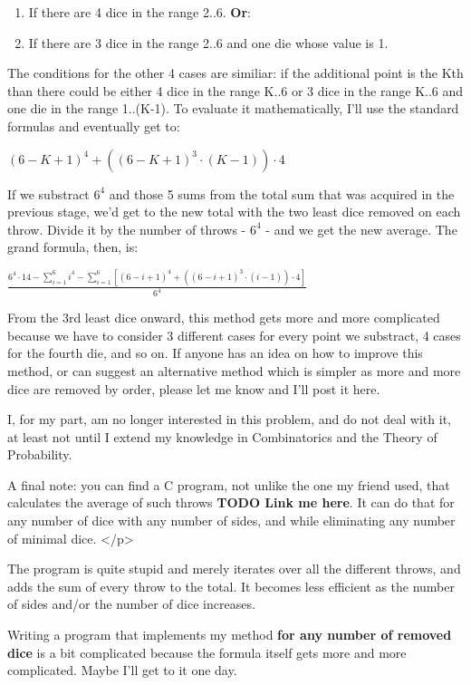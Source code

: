 \documentclass[a4paper]{article}
\begin{document}
\begin{enumerate}
\item If there are 4 dice in the range 2..6. {\bf Or}:
\item If there are 3 dice in the range 2..6 and one die whose value is 1.
\end{enumerate}

The conditions for the other 4 cases are similiar: if the additional point
is the Kth than there could be either 4 dice in the range K..6 or 3 dice in
the range K..6 and one die in the range 1..(K-1). To evaluate it
mathematically, I'll use the standard formulas and eventually get to:

$\left(6-K+1\right)^4  +  \left( \left(6-K+1\right)^3 \cdot \left(K-1\right) \right) \cdot 4$


If we substract $6^4$ and those 5 sums from the total sum that was acquired in
the previous stage, we'd get to the new total with the two least dice
removed on each throw. Divide it by the number of throws - $6^4$ - and we get
the new average. The grand formula, then, is:

$ \frac{
    6^4\cdot14-\sum\limits_{i=1}^{6}\left.i^4\right. -
    \sum\limits_{i=1}^{6}\left[\left(6-i+1\right)^4+\left(\left(6-i+1\right)^3
    \cdot \left(i-1\right)\right) \cdot 4 \right]
}{6^4}$

From the 3rd least dice onward, this method gets more and more complicated
because we have to consider 3 different cases for every point we
substract, 4 cases for the fourth die, and so on. If anyone has an idea
on how to improve this method, or can suggest an alternative method
which is simpler as more and more dice are removed by order, please let
me know and I'll post it here.

I, for my part, am no longer interested in this problem, and do not deal
with it, at least not until I extend my knowledge in Combinatorics and the
Theory of Probability.

A final note: you can find a C program, not unlike the one my friend used,
that calculates the average of such throws
{\bf TODO Link me here}. It can do that for any number of
dice with any number of sides, and while eliminating any number of minimal
dice.
</p>

The program is quite stupid and merely iterates over all the
different throws, and adds the sum of every throw to the total. It
becomes less efficient as the number of sides and/or the number of dice
increases.

Writing a program that implements my method {\bf for any number of removed
dice} is a bit complicated because the formula itself gets more and more
complicated. Maybe I'll get to it one day.
\end{document}
